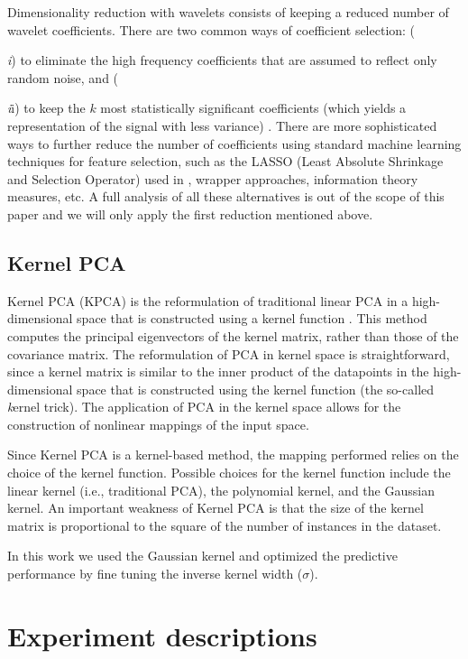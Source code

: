 \documentclass[a4paper,fleqn,usenatbib]{mnras}
\begin{document}
{Dimensionality reduction with wavelets consists of keeping a reduced
number of wavelet coefficients. There are two common ways of
coefficient selection: ({\textit i) to eliminate the high frequency
  coefficients that are assumed to reflect only random noise, and
  ({\textit ii) to keep the $k$ most statistically significant
    coefficients (which yields a representation of the signal with
    less variance) \citep{li:10}. There are more sophisticated ways to
    further reduce the number of coefficients using standard machine
    learning techniques for feature selection, such as the LASSO
    (Least Absolute Shrinkage and Selection Operator) used in
    \cite{2015MNRAS.452.1394L}, wrapper approaches, information theory
    measures, etc. A full analysis of all these alternatives is out of
    the scope of this paper and we will only apply the first reduction
    mentioned above.

\subsection{Kernel PCA}

Kernel PCA (KPCA) is the reformulation of traditional linear PCA in a
high-dimensional space that is constructed using a kernel function
\citep{sholkopf:98}. This method computes the principal eigenvectors
of the kernel matrix, rather than those of the covariance matrix. The
reformulation of PCA in kernel space is straightforward, since a
kernel matrix is similar to the inner product of the datapoints in the
high-dimensional space that is constructed using the kernel function
(the so-called {\textit kernel trick}). The application of PCA in the
kernel space allows for the construction of nonlinear mappings of the
input space.

Since Kernel PCA is a kernel-based method, the mapping performed
relies on the choice of the kernel function. Possible choices for the
kernel function include the linear kernel (i.e., traditional PCA), the
polynomial kernel, and the Gaussian kernel. An important weakness of
Kernel PCA is that the size of the kernel matrix is proportional to
the square of the number of instances in the dataset.

In this work we used the Gaussian kernel and optimized the predictive
performance by fine tuning the inverse kernel width ($\sigma$).
 
\section{Experiment descriptions}
\label{sec:experiment}
}}}
\end{document}
